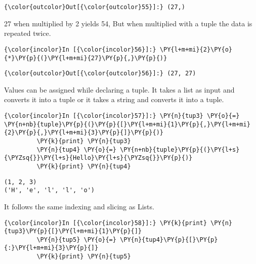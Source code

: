             \begin{Verbatim}[commandchars=\\\{\}]
{\color{outcolor}Out[{\color{outcolor}55}]:} (27,)
\end{Verbatim}
        
    27 when multiplied by 2 yields 54, But when multiplied with a tuple the
data is repeated twice.

    \begin{Verbatim}[commandchars=\\\{\}]
{\color{incolor}In [{\color{incolor}56}]:} \PY{l+m+mi}{2}\PY{o}{*}\PY{p}{(}\PY{l+m+mi}{27}\PY{p}{,}\PY{p}{)}
\end{Verbatim}

            \begin{Verbatim}[commandchars=\\\{\}]
{\color{outcolor}Out[{\color{outcolor}56}]:} (27, 27)
\end{Verbatim}
        
    Values can be assigned while declaring a tuple. It takes a list as input
and converts it into a tuple or it takes a string and converts it into a
tuple.

    \begin{Verbatim}[commandchars=\\\{\}]
{\color{incolor}In [{\color{incolor}57}]:} \PY{n}{tup3} \PY{o}{=} \PY{n+nb}{tuple}\PY{p}{(}\PY{p}{[}\PY{l+m+mi}{1}\PY{p}{,}\PY{l+m+mi}{2}\PY{p}{,}\PY{l+m+mi}{3}\PY{p}{]}\PY{p}{)}
         \PY{k}{print} \PY{n}{tup3}
         \PY{n}{tup4} \PY{o}{=} \PY{n+nb}{tuple}\PY{p}{(}\PY{l+s}{\PYZsq{}}\PY{l+s}{Hello}\PY{l+s}{\PYZsq{}}\PY{p}{)}
         \PY{k}{print} \PY{n}{tup4}
\end{Verbatim}

    \begin{Verbatim}[commandchars=\\\{\}]
(1, 2, 3)
('H', 'e', 'l', 'l', 'o')
    \end{Verbatim}

    It follows the same indexing and slicing as Lists.

    \begin{Verbatim}[commandchars=\\\{\}]
{\color{incolor}In [{\color{incolor}58}]:} \PY{k}{print} \PY{n}{tup3}\PY{p}{[}\PY{l+m+mi}{1}\PY{p}{]}
         \PY{n}{tup5} \PY{o}{=} \PY{n}{tup4}\PY{p}{[}\PY{p}{:}\PY{l+m+mi}{3}\PY{p}{]}
         \PY{k}{print} \PY{n}{tup5}
\end{Verbatim}


